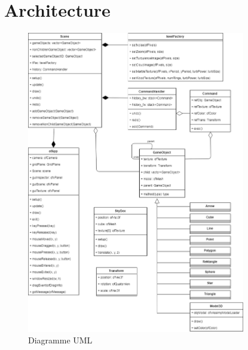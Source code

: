 \section{Architecture}
\label{s:architecture}

\begin{figure}[H]
\centering
\includegraphics[width=0.85\textwidth]{img/INFOG-diagram-UML.png}
\caption{Diagramme UML}\label{fig-diagram-uml}
\end{figure}